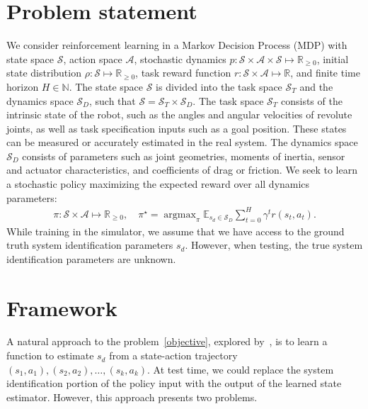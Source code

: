 \documentclass{article}
\newcommand{\R}{\mathbb{R}}
\newcommand{\E}{\mathbb{E}}
\newcommand{\cA}{\mathcal{A}}
\newcommand{\cS}{\mathcal{S}}
\DeclareMathOperator*{\argmax}{argmax}
\begin{document}
\section{Problem statement}

We consider reinforcement learning in a Markov Decision Process (MDP)
with state space $\cS$,
action space $\cA$,
stochastic dynamics $p : \cS \times \cA \times \cS \mapsto \R_{\geq 0}$,
initial state distribution $\rho : \cS \mapsto \R_{\geq 0}$,
task reward function $r : \cS \times \cA \mapsto \R$,
and finite time horizon $H \in \mathbb{N}$.
The state space $\cS$ is divided into
the task space $\cS_T$
and the dynamics space $\cS_D$, such that $\cS = \cS_T \times \cS_D$.
The task space $\cS_T$ consists of the intrinsic state of the robot, such as the angles and angular velocities of revolute joints, as well as task specification inputs such as a goal position.
These states can be measured or accurately estimated in the real system.
The dynamics space $\cS_D$ consists of parameters such as joint geometries, moments of inertia, sensor and actuator characteristics, and coefficients of drag or friction.
We seek to learn a stochastic policy maximizing the expected reward over all dynamics parameters:
\begin{equation}\begin{split}
\pi : \cS \times \cA \mapsto \R_{\geq 0}, \quad
\pi^\star = \argmax_\pi \E_{s_d \in \cS_D} \sum_{t = 0}^H
\gamma^t r(s_t, a_t).
\label{objective}
\end{split}\end{equation}
While training in the simulator, we assume that we have access to the ground truth system identification parameters $s_d$.
However, when testing, the true system identification parameters are unknown.

\section{Framework}
A natural approach to the problem~\eqref{objective}, explored by~\citet{yu-up-osi-rss17}, is to learn a function to estimate $s_d$ from a state-action trajectory $(s_1, a_1), (s_2, a_2), \dots, (s_k, a_k)$.
At test time, we could replace the system identification portion of the policy input
with the output of the learned state estimator.
However, this approach presents two problems.
\end{document}
